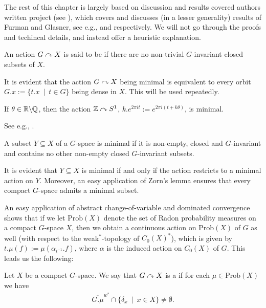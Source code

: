 The rest of this chapter is largely based on discussion and results covered authors written project (see \cite{bscp}), which covers and discusses (in a lesser generality) results of Furman and Glasner, see e.g., \cite{furman2003minimal} and \cite{glasner1976proximal} respectively. We will not go through the proofs and techincal details, and instead offer a heuristic explanation.
\begin{definition}
	An action $G \stackrel{}{\curvearrowright} X$ is said to be  if there are no non-trivial $G$-invariant closed subsets of $X$.
\end{definition}
\begin{remark}
	It is evident that the action $G \stackrel{}{\curvearrowright} X$ being minimal is equivalent to every orbit $G.x := \{t.x \ \mid \ t \in G\}$ being dense in $X$. This will be used repeatedly.
\end{remark}
\begin{example}
	If $\theta \in \mathbb{R} \backslash \mathbb{Q}$, then the action $\mathbb{Z} \stackrel{}{\curvearrowright} S^1$, $k.e^{2\pi i t}:= e^{2 \pi i (t+k\theta)}$, is minimal.	
\end{example}
See e.g., \mbox{\cite[Example 4.6]{bscp}}. 
\begin{definition}
	A subset $Y \subseteq X$ of a $G$-space is minimal if it is non-empty, closed and $G$-invariant and contains no other non-empty closed $G$-invariant subsets.
\end{definition}
\begin{remark}
	It is evident that $Y \subseteq X$ is minimal if and only if the action restricts to a minimal action on $Y$. Moreover, an easy application of Zorn's lemma ensures that every compact $G$-space admits a minimal subset.
\end{remark}
An easy application of abstract change-of-variable and dominated convergence shows that if we let $\mathrm{Prob}(X)$ denote the set of Radon probability measures on a compact $G$-space $X$, then we obtain a continuous action on $\mathrm{Prob}(X)$ of $G$ as well (with respect to the weak$^*$-topology of $C_0(X)^*$), which is given by $t.\mu(f) := \mu(\alpha_{t^{-1}}.f)$, where $\alpha$ is the induced action on $C_0(X)$ of $G$. This leads us the following:
\begin{definition}
	Let $X$ be a compact $G$-space. We say that $G \stackrel{}{\curvearrowright} X$ is a  if for each $\mu \in \mathrm{Prob}(X)$ we have
	\begin{align*}
		\overline{G.\mu}^{w^*} \cap \{\delta_x \ \mid \ x \in X\} \neq \emptyset.
	\end{align*}
\end{definition}
